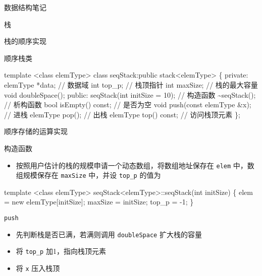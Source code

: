 \documentclass[
  ignorenonframetext,
]{beamer}
\newenvironment{Shaded}{}{}
\newcommand{\NormalTok}[1]{#1}
\providecommand{\tightlist}{%
  \setlength{\itemsep}{0pt}\setlength{\parskip}{0pt}}
\begin{document}
\begin{frame}[fragile]{数据结构笔记}
\begin{block}{栈}
\begin{block}{栈的顺序实现}
\begin{block}{顺序栈类}
\protect{}\label{ux987aux5e8fux6808ux7c7b}
\begin{Shaded}
\begin{Highlighting}[]
\NormalTok{template \textless{}class elemType\textgreater{}}
\NormalTok{class seqStack:public stack\textless{}elemType\textgreater{}}
\NormalTok{\{}
\NormalTok{  private:}
\NormalTok{    elemType *data;                     // 数据域}
\NormalTok{    int top\_p;                          // 栈顶指针}
\NormalTok{    int maxSize;                        // 栈的最大容量}
\NormalTok{    void doubleSpace();                }
\NormalTok{  public:}
\NormalTok{    seqStack(int initSize = 10);        // 构造函数}
\NormalTok{    \textasciitilde{}seqStack();                        // 析构函数}
\NormalTok{    bool isEmpty() const;               // 是否为空}
\NormalTok{    void push(const elemType \&x);       // 进栈}
\NormalTok{    elemType pop();                    // 出栈}
\NormalTok{    elemType top() const;               // 访问栈顶元素}
\NormalTok{\};}
\end{Highlighting}
\end{Shaded}
\end{block}

\begin{block}{顺序存储的运算实现}
\protect{}\label{ux987aux5e8fux5b58ux50a8ux7684ux8fd0ux7b97ux5b9eux73b0}
\begin{block}{构造函数}
\protect{}\label{ux6784ux9020ux51fdux6570-3}
\begin{itemize}
\tightlist
\item
  按照用户估计的栈的规模申请一个动态数组，将数组地址保存在 \texttt{elem}
  中，数组规模保存在 \texttt{maxSize} 中，并设 \texttt{top\_p} 的值为 {}
\end{itemize}

\begin{Shaded}
\begin{Highlighting}[]
\NormalTok{template \textless{}class elemType\textgreater{}}
\NormalTok{seqStack\textless{}elemType\textgreater{}::seqStack(int initSize)}
\NormalTok{\{}
\NormalTok{  elem = new elemType[initSize];}
\NormalTok{  maxSize = initSize;}
\NormalTok{  top\_p = {-}1;}
\NormalTok{\}}
\end{Highlighting}
\end{Shaded}
\end{block}
\end{block}

\begin{block}{\texttt{push}}
\protect{}\label{push}
\begin{itemize}
\tightlist
\item
  先判断栈是否已满，若满则调用 \texttt{doubleSpace} 扩大栈的容量
\item
  将 \texttt{top\_p} 加1，指向栈顶元素
\item
  将 \texttt{x} 压入栈顶
\end{itemize}


\end{block}
\end{block}
\end{block}
\end{frame}
\end{document}
